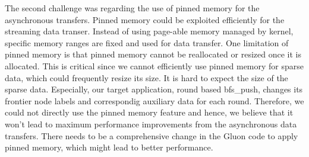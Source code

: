 The second challenge was regarding the use of pinned memory for the asynchronous transfers. 
Pinned memory could be exploited efficiently for the streaming data transer.
Instead of using page-able memory managed by kernel, specific memory ranges are fixed and used for data transfer.
One limitation of pinned memory is that pinned memory cannot be reallocated or resized once it is allocated.
This is critical since we cannot efficiently use pinned memory for sparse data, which could frequently resize its size.
It is hard to expect the size of the sparse data.
Especially, our target application, round based bfs\_push, changes its frontier node labels and 
correspondig auxiliary data for each round.
Therefore, we could not directly use the pinned memory feature and hence, we believe that it won't 
lead to maximum performance improvements from the asynchronous data transfers.
There needs to be a comprehensive change in the Gluon code to apply pinned memory, which might lead to better performance.


